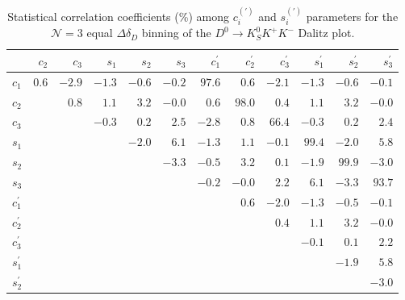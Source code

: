 \documentclass[aps,prd,superscriptaddress,nopreprintnumbers,nofootinbib,showpacs,floatfix]{revtex4}
\begin{document}
\begin{table}[htb]
\caption{Statistical correlation coefficients (\%) among $c^{(\prime)}_{i}$ and $s^{(\prime)}_{i}$ parameters for %
the $\mathcal{N}=3$ equal $\Delta\delta_D$ binning of the $D^{0}\to K^{0}_{S}K^{+}K^{-}$ Dalitz %
plot.}\label{tab:corr_K0SKK_3bin_stat}
\begin{center} 
\begin{tabular}{lrrrrrrrrrrr} \hline\hline
                & $c_2 $ & $c_3$ & $s_1$ & $s_2$ & $s_3$ & $c^{\prime}_1$ & $c^{\prime}_2$ & $c^{\prime}_3$ & %
$s^{\prime}_1$ & $s^{\prime}_2$ & $s^{\prime}_3$ \\ \hline 
$c_1$           & $  0.6 $  & $ -2.9 $  & $ -1.3 $  & $ -0.6 $  & $ -0.2 $  & $  97.6 $ & $  0.6 $  & $ -2.1 $  & $ %
-1.3 $  & $ -0.6 $  & $ -0.1 $ \\ 
$c_2$           &           & $  0.8 $  & $  1.1 $  & $  3.2 $  & $  -0.0 $ & $  0.6 $  & $  98.0 $ & $  0.4 $  & $  %
1.1 $  & $  3.2 $  & $  -0.0 $ \\
$c_3$           &           &           & $ -0.3 $  & $  0.2 $  & $  2.5 $  & $ -2.8 $  & $  0.8 $  & $  66.4 $ & $ %
-0.3 $  & $  0.2 $  & $  2.4 $ \\ 
$s_1$           &           &           &           & $ -2.0 $  & $  6.1 $  & $ -1.3 $  & $  1.1 $  & $ -0.1 $  & $  %
99.4 $ & $ -2.0 $  & $  5.8 $ \\ 
$s_2$           &           &           &           &           & $ -3.3 $  & $ -0.5 $  & $  3.2 $  & $  0.1 $  & $ %
-1.9 $  & $  99.9 $ & $ -3.0 $ \\ 
$s_3$           &           &           &           &           &           & $ -0.2 $  & $  -0.0 $ & $  2.2 $  & $  %
6.1 $  & $ -3.3 $  & $  93.7 $ \\
$c^{\prime}_1$  &           &           &           &           &           &           & $  0.6 $  & $ -2.0 $  & $ %
-1.3 $  & $ -0.5 $  & $ -0.1 $ \\ 
$c^{\prime}_2$  &           &           &           &           &           &           &           & $  0.4 $  & $  %
1.1 $  & $  3.2 $  & $  -0.0 $ \\
$c^{\prime}_3$  &           &           &           &           &           &           &           &           & $ %
-0.1 $  & $  0.1 $  & $  2.2 $ \\ 
$s^{\prime}_1$  &           &           &           &           &           &           &           &           &           %
& $ -1.9 $  & $  5.8 $ \\ 
$s^{\prime}_2$  &           &           &           &           &           &           &           &           &           %
&           & $ -3.0 $ \\ 
\hline\hline
\end{tabular}
\end{center}
\end{table}
\end{document}
